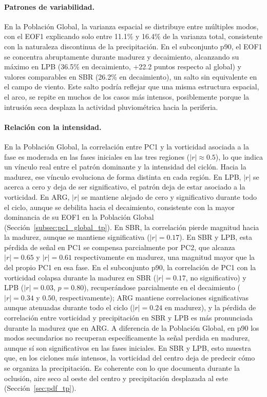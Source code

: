 \paragraph{Patrones de variabilidad.}
En la Población Global, la varianza espacial se distribuye entre múltiples modos, con el EOF1 explicando solo entre 11.1\% y 16.4\% de la varianza total, consistente con la naturaleza discontinua de la precipitación. En el subconjunto p90, el EOF1 se concentra abruptamente durante madurez y decaimiento, alcanzando su máximo en LPB (36.5\% en decaimiento, $+$22.2 puntos respecto al global) y valores comparables en SBR (26.2\% en decaimiento), un salto sin equivalente en el campo de viento. Este salto podría reflejar que una misma estructura espacial, el arco, se repite en muchos de los casos más intensos, posiblemente porque la intrusión seca desplaza la actividad pluviométrica hacia la periferia.

\paragraph{Relación con la intensidad.}
En la Población Global, la correlación entre PC1 y la vorticidad asociada a la fase es moderada en las fases iniciales en las tres regiones ($|r|\approx0.5$), lo que indica un vínculo real entre el patrón dominante y la intensidad del ciclón. Hacia la madurez, ese vínculo evoluciona de forma distinta en cada región. En LPB, $|r|$ se acerca a cero y deja de ser significativo, el patrón deja de estar asociado a la vorticidad. En ARG, $|r|$ se mantiene alejado de cero y significativo durante todo el ciclo, aunque se debilita hacia el decaimiento, consistente con la mayor dominancia de su EOF1 en la Población Global (Sección~\ref{subsec:pc1_global_tp}). En SBR, la correlación pierde magnitud hacia la madurez, aunque se mantiene significativa ($|r|=0.17$). En SBR y LPB, esta pérdida de señal en PC1 se compensa parcialmente por PC2, que alcanza $|r|=0.65$ y $|r|=0.61$ respectivamente en madurez, una magnitud mayor que la del propio PC1 en esa fase. En el subconjunto p90, la correlación de PC1 con la vorticidad colapsa durante la madurez en SBR ($|r|=0.17$, no significativo) y LPB ($|r|=0.03$, $p = 0.80$), recuperándose parcialmente en el decaimiento ($|r|=0.34$ y $0.50$, respectivamente); ARG mantiene correlaciones significativas aunque atenuadas durante todo el ciclo ($|r|=0.24$ en madurez), y la pérdida de correlación entre vorticidad y precipitación en SBR y LPB es más pronunciada durante la madurez que en ARG. A diferencia de la Población Global, en p90 los modos secundarios no recuperan específicamente la señal perdida en madurez, aunque sí son significativos en las fases iniciales. En SBR y LPB, esto muestra que, en los ciclones más intensos, la vorticidad del centro deja de predecir cómo se organiza la precipitación. Es coherente con lo que documenta \citet{shapiro1999bridge} durante la oclusión, aire seco al oeste del centro y precipitación desplazada al este (Sección~\ref{sec:pdf_tp}).

